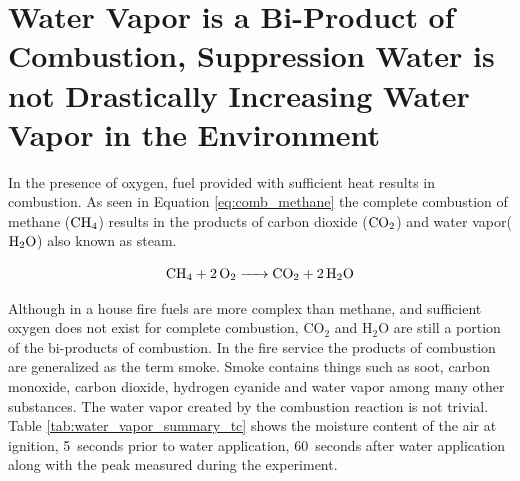 \documentclass[12pt,oneside]{book}
\begin{document}
\section[Water vapor is a bi-product of combustion]{Water Vapor is a Bi-Product of Combustion, Suppression Water is not Drastically Increasing Water Vapor in the Environment} \label{tc:steam_is_biproduct_of_combustion}

In the presence of oxygen, fuel provided with sufficient heat results in combustion. As seen in Equation \ref{eq:comb_methane} the complete combustion of methane ($\ce{CH4}$) results in the products of carbon dioxide ($\ce{CO2}$) and water vapor($\ce{H2O}$) also known as steam. 

\begin{equation}
\ce{CH4 + 2O2 -> CO2 + 2H2O}
\label{eq:comb_methane}
\end{equation}

Although in a house fire fuels are more complex than methane, and sufficient oxygen does not exist for complete combustion, CO$_2$ and H$_2$O are still a portion of the bi-products of combustion. In the fire service the products of combustion are generalized as the term smoke. Smoke contains things such as soot, carbon monoxide, carbon dioxide, hydrogen cyanide and water vapor among many other substances. The water vapor created by the combustion reaction is not trivial. Table \ref{tab:water_vapor_summary_tc} shows the moisture content of the air at ignition, 5~seconds prior to water application, 60~seconds after water application along with the peak measured during the experiment. 
\end{document}
